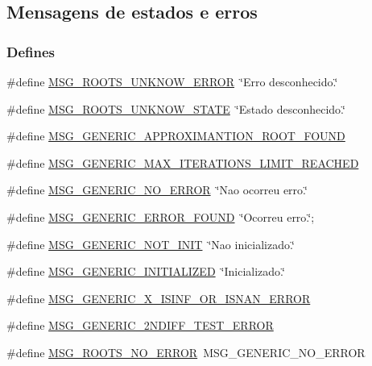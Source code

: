 \hypertarget{group____messages}{
\subsection{Mensagens de estados e erros}
\label{group____messages}
}
\subsubsection*{Defines}
\begin{CompactItemize}
\item 
\#define \hyperlink{group____messages_g9d5756daf9e0e99c65a2b72531a0b765}{MSG\_\-ROOTS\_\-UNKNOW\_\-ERROR}~\char`\"{}Erro desconhecido.\char`\"{}
\item 
\#define \hyperlink{group____messages_gf33ab54fcaa61fcc47cb9c5dece317e2}{MSG\_\-ROOTS\_\-UNKNOW\_\-STATE}~\char`\"{}Estado desconhecido.\char`\"{}
\item 
\#define \hyperlink{group____messages_g1cd065e37768f9ba5e945f01e5223149}{MSG\_\-GENERIC\_\-APPROXIMANTION\_\-ROOT\_\-FOUND}
\item 
\#define \hyperlink{group____messages_g07f4e1141d65130c4dad0a273735d81e}{MSG\_\-GENERIC\_\-MAX\_\-ITERATIONS\_\-LIMIT\_\-REACHED}
\item 
\#define \hyperlink{group____messages_gc4f8d165b6144573adc8ce2776826c49}{MSG\_\-GENERIC\_\-NO\_\-ERROR}~\char`\"{}Nao ocorreu erro.\char`\"{}
\item 
\#define \hyperlink{group____messages_g256cb6d156d41a9029016f3284a43a19}{MSG\_\-GENERIC\_\-ERROR\_\-FOUND}~\char`\"{}Ocorreu erro.\char`\"{};
\item 
\#define \hyperlink{group____messages_gb9e27a0fd9a540c07295263a8daa57e1}{MSG\_\-GENERIC\_\-NOT\_\-INIT}~\char`\"{}Nao inicializado.\char`\"{}
\item 
\#define \hyperlink{group____messages_g37731c9a9a8f20520f275e8cd3e75491}{MSG\_\-GENERIC\_\-INITIALIZED}~\char`\"{}Inicializado.\char`\"{}
\item 
\#define \hyperlink{group____messages_g00d31c81dbc7f971424196036c148a1a}{MSG\_\-GENERIC\_\-X\_\-ISINF\_\-OR\_\-ISNAN\_\-ERROR}
\item 
\#define \hyperlink{group____messages_gce1123edca28cb0b02531869093e7214}{MSG\_\-GENERIC\_\-2NDIFF\_\-TEST\_\-ERROR}
\item 
\#define \hyperlink{group____messages_g8ccd3ef3d66c52d9a2f5c56b7c62e837}{MSG\_\-ROOTS\_\-NO\_\-ERROR}~MSG\_\-GENERIC\_\-NO\_\-ERROR
\item 

\end{CompactItemize}
